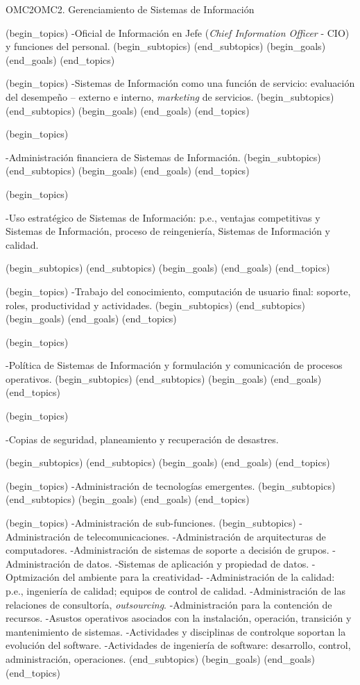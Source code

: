 \begin{BKL2}{OMC2}{OMC2. Gerenciamiento de Sistemas de Información}
 

(begin_topics)
-Oficial de Información en Jefe (\emph{Chief Information Officer} - CIO) y funciones del personal.
(begin_subtopics)
(end_subtopics)
(begin_goals)
(end_goals)
(end_topics)

 

(begin_topics)
-Sistemas de Información como una función de servicio: evaluación del desempeño -- externo e interno, {\it marketing} de servicios.
(begin_subtopics)
(end_subtopics)
(begin_goals)
(end_goals)
(end_topics)

 

(begin_topics)

-Administración financiera de Sistemas de Información.
(begin_subtopics)
(end_subtopics)
(begin_goals)
(end_goals)
(end_topics)

 

(begin_topics)

-Uso estratégico de Sistemas de Información: p.e., ventajas competitivas y Sistemas de Información, proceso de reingeniería, Sistemas de Información y calidad.

(begin_subtopics)
(end_subtopics)
(begin_goals)
(end_goals)
(end_topics)

 

(begin_topics)
-Trabajo del conocimiento, computación de usuario final: soporte, roles, productividad y actividades.
(begin_subtopics)
(end_subtopics)
(begin_goals)
(end_goals)
(end_topics)

 

(begin_topics)

-Política de Sistemas de Información y formulación y comunicación de procesos operativos.
(begin_subtopics)
(end_subtopics)
(begin_goals)
(end_goals)
(end_topics)

 

(begin_topics)

-Copias de seguridad, planeamiento y recuperación de desastres.

(begin_subtopics)
(end_subtopics)
(begin_goals)
(end_goals)
(end_topics)

 

(begin_topics)
-Administración de tecnologías emergentes.
(begin_subtopics)
(end_subtopics)
(begin_goals)
(end_goals)
(end_topics)

 

(begin_topics)
-Administración de sub-funciones.
(begin_subtopics)
-Administración de telecomunicaciones.
-Administración de arquitecturas de computadores.
-Administración de sistemas de soporte a decisión de grupos.
-Administración de datos.
-Sistemas de aplicación y propiedad de datos.
-Optmización del ambiente para la creatividad-
-Administración de la calidad: p.e., ingeniería de calidad; equipos de control de calidad.
-Administración de las relaciones de consultoría, {\it outsourcing}.
-Administración para la contención de recursos.
-Asustos operativos asociados con la instalación, operación, transición y mantenimiento de sistemas.
-Actividades y disciplinas de controlque soportan la evolución del software.
-Actividades de ingeniería de software: desarrollo, control, administración, operaciones.
(end_subtopics)
(begin_goals)
(end_goals)
(end_topics)


\end{BKL2}
